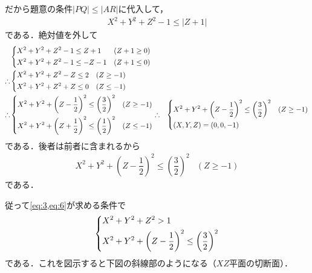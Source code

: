 \documentclass[../../main.tex]{subfiles}
\begin{document}
だから題意の条件$|PQ|\le|AR|$に代入して，
\begin{align}
  X^2+Y^2+Z^2-1\le|Z+1|
\end{align}
である．絶対値を外して
\begin{align}
  &
  \begin{dcases}
    X^2+Y^2+Z^2-1 \le Z+1  & (Z+1 \ge 0) \\
    X^2+Y^2+Z^2-1 \le -Z-1 & (Z+1 \le 0)
  \end{dcases} \\
  \therefore
  &
  \begin{dcases}
    X^2+Y^2+Z^2-Z \le 2  & (Z \ge -1) \\
    X^2+Y^2+Z^2+Z \le 0  & (Z \le -1)
  \end{dcases} \\
  \therefore
  &
  \begin{dcases}
    X^2+Y^2+\left(Z-\dfrac{1}{2}\right)^2  \le \left(\dfrac{3}{2}\right)^2 & (Z \ge -1) \\
    X^2+Y^2+\left(Z+\dfrac{1}{2}\right)^2  \le \left(\dfrac{1}{2}\right)^2 & (Z \le -1)
  \end{dcases}
  \therefore
  &
  \begin{dcases}
    X^2+Y^2+\left(Z-\dfrac{1}{2}\right)^2  \le \left(\dfrac{3}{2}\right)^2 & (Z \ge -1) \\
    (X,Y,Z)=(0,0,-1)
  \end{dcases}
\end{align}
である．後者は前者に含まれるから
\begin{align}
  X^2+Y^2+\left(Z-\dfrac{1}{2}\right)^2  \le \left(\dfrac{3}{2}\right)^2 & (Z \ge -1) \label{eq:6}
\end{align}
である．

従って\cref{eq:3,eq:6}が求める条件で
\begin{align}
  \begin{dcases}
    X^2+Y^2+Z^2 > 1 \\
    X^2+Y^2+\left(Z-\dfrac{1}{2}\right)^2 \le \left(\dfrac{3}{2}\right)^2
  \end{dcases} \label{eq:7}
\end{align}
である．これを図示すると下図の斜線部のようになる（$XZ$平面の切断面）．
\end{document}
